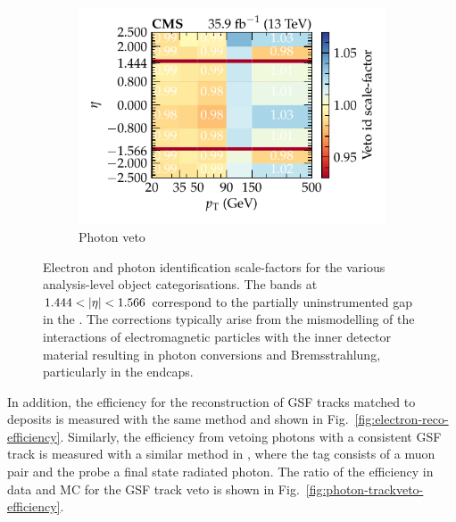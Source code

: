 \begin{figure}[htbp]
\begin{subfigure}[b]{0.49\textwidth}
        \centering
        \includegraphics{chapters/041_corrections/images/efficiencies/objects/photons/photon_id_veto_sf.pdf}
        \caption{Photon veto}
        \label{subfigc:egamma-id-iso-efficiency}
    \end{subfigure}
    \caption{
        Electron and photon identification scale-factors for the various analysis-level object categorisations. The bands at ${1.444<\aeta<1.566}$ correspond to the partially uninstrumented gap in the \ECAL. The corrections typically arise from the mismodelling of the interactions of electromagnetic particles with the inner detector material resulting in photon conversions and Bremsstrahlung, particularly in the endcaps. 
    }
    \label{fig:egamma-id-iso-efficiency}
\end{figure}

In addition, the efficiency for the reconstruction of GSF tracks matched to
\ECAL deposits is measured with the same method and shown in
Fig.~\ref{fig:electron-reco-efficiency}. Similarly, the efficiency from
vetoing photons with a consistent GSF track is measured with a similar method
in \IDYmmg, where the tag consists of a muon pair and the probe a
final state radiated photon. The ratio of the efficiency in data and MC for
the GSF track veto is shown in Fig.~\ref{fig:photon-trackveto-efficiency}.

